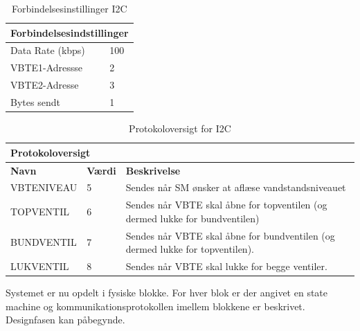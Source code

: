 \begin{table}[H]
\centering
\begin{tabular}{|l|l|}
\multicolumn{2}{l}{{\Large Forbindelsesindstillinger}} \\\hline
Data Rate (kbps)&100\\\hline
VBTE1-Adressse&2\\\hline
VBTE2-Adresse&3\\\hline
Bytes sendt&1\\\hline
\end{tabular}
\caption{Forbindelsesinstillinger I2C}
\label{tabel:forbindelsesindstillinger}
\end{table}

\begin{table}[htbp]
\centering
\begin{tabular}{|l|l|p{10cm}|}
\multicolumn{2}{l}{{\Large Protokoloversigt}} \\\hline
\textbf{Navn} &\textbf{Værdi} &\textbf{Beskrivelse}\\\hline
VBTENIVEAU&5&Sendes når SM ønsker at aflæse vandstandsniveauet\\\hline
TOPVENTIL&6&Sendes når VBTE skal åbne for topventilen (og dermed lukke for bundventilen)\\\hline
BUNDVENTIL&7&Sendes når VBTE skal åbne for bundventilen (og dermed lukke for topventilen).\\\hline
LUKVENTIL&8&Sendes når VBTE skal lukke for begge ventiler.\\\hline
\end{tabular}
\caption{Protokoloversigt for I2C}
\label{tabel:protokoloversigt}
\end{table}

Systemet er nu opdelt i fysiske blokke. For hver blok er der angivet en state machine og kommunikationsprotokollen imellem blokkene er beskrivet. Designfasen kan påbegynde.




